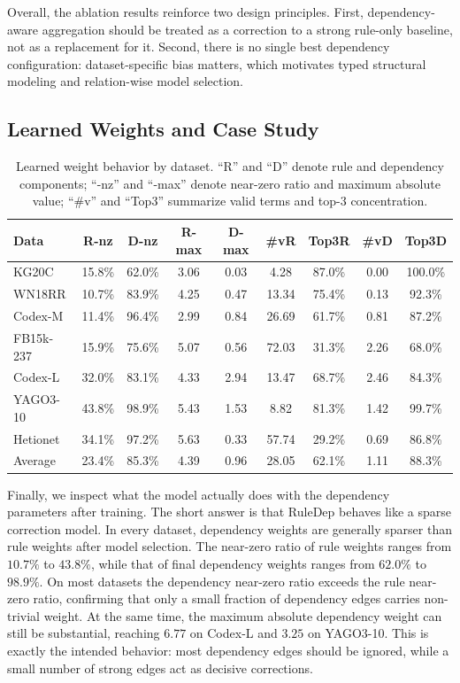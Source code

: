 Overall, the ablation results reinforce two design principles. First, dependency-aware aggregation should be treated as a correction to a strong rule-only baseline, not as a replacement for it. Second, there is no single best dependency configuration: dataset-specific bias matters, which motivates typed structural modeling and relation-wise model selection.

\subsection{Learned Weights and Case Study}
\label{sec:exp-weight}

\begin{table}[t]
\centering
\caption{Learned weight behavior by dataset. ``R'' and ``D'' denote rule and dependency components; ``-nz'' and ``-max'' denote near-zero ratio and maximum absolute value; ``\#v'' and ``Top3'' summarize valid terms and top-3 concentration.}
\label{tab:weight-summary}
\setlength{\tabcolsep}{3pt}
\renewcommand{\arraystretch}{1.1}
\footnotesize
\begin{tabular}{lcccccccc}
\toprule
Data & R-nz & D-nz & R-max & D-max & \#vR & Top3R & \#vD & Top3D \\
\midrule
KG20C     & 15.8\% & 62.0\% & 3.06 & 0.03 & 4.28 & 87.0\% & 0.00 & 100.0\% \\
WN18RR    & 10.7\% & 83.9\% & 4.25 & 0.47 & 13.34 & 75.4\% & 0.13 & 92.3\% \\
Codex-M   & 11.4\% & 96.4\% & 2.99 & 0.84 & 26.69 & 61.7\% & 0.81 & 87.2\% \\
FB15k-237 & 15.9\% & 75.6\% & 5.07 & 0.56 & 72.03 & 31.3\% & 2.26 & 68.0\% \\
Codex-L   & 32.0\% & 83.1\% & 4.33 & 2.94 & 13.47 & 68.7\% & 2.46 & 84.3\% \\
YAGO3-10  & 43.8\% & 98.9\% & 5.43 & 1.53 & 8.82 & 81.3\% & 1.42 & 99.7\% \\
Hetionet  & 34.1\% & 97.2\% & 5.63 & 0.33 & 57.74 & 29.2\% & 0.69 & 86.8\% \\
\midrule
Average   & 23.4\% & 85.3\% & 4.39 & 0.96 & 28.05 & 62.1\% & 1.11 & 88.3\% \\
\bottomrule
\end{tabular}
\end{table}

Finally, we inspect what the model actually does with the dependency parameters after training. The short answer is that RuleDep behaves like a sparse correction model. In every dataset, dependency weights are generally sparser than rule weights after model selection. The near-zero ratio of rule weights ranges from $10.7\%$ to $43.8\%$, while that of final dependency weights ranges from $62.0\%$ to $98.9\%$. On most datasets the dependency near-zero ratio exceeds the rule near-zero ratio, confirming that only a small fraction of dependency edges carries non-trivial weight. At the same time, the maximum absolute dependency weight can still be substantial, reaching $6.77$ on Codex-L and $3.25$ on YAGO3-10. This is exactly the intended behavior: most dependency edges should be ignored, while a small number of strong edges act as decisive corrections.


